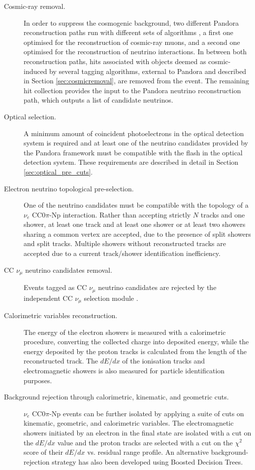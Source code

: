 \begin{description}
\item[Cosmic-ray removal.] In order to suppress the cosmogenic background, two different Pandora reconstruction paths run with different sets of algorithms \cite{Acciarri:2017hat}, a first one optimised for the reconstruction of cosmic-ray muons, and a second one optimised for the reconstruction of neutrino interactions. In between both reconstruction paths, hits associated with objects deemed as cosmic-induced by several tagging algorithms, external to Pandora and described in Section \ref{sec:cosmicremoval}, are removed from the event. The remaining hit collection provides the input to the Pandora neutrino reconstruction path, which outputs a list of candidate neutrinos.

\item[Optical selection.] A minimum amount of coincident photoelectrons in the optical detection system is required and at least one of the neutrino candidates provided by the Pandora framework must be compatible with the flash in the optical detection system. These requirements are described in detail in Section \ref{sec:optical_pre_cuts}.

\item[Electron neutrino topological pre-selection.] One of the neutrino candidates must be compatible with the topology of a $\nu_{e}$ CC0$\pi$-Np interaction. Rather than accepting strictly $N$ tracks and one shower, at least one track and at least one shower or at least two showers sharing a common vertex are accepted, due to the presence of split showers and split tracks. Multiple showers without reconstructed tracks are accepted due to a current track/shower identification inefficiency.

\item[CC $\nu_{\mu}$ neutrino candidates removal.] Events tagged as CC $\nu_{\mu}$ neutrino candidates are rejected by the independent CC $\nu_{\mu}$ selection module \cite{ubxsec}. 

\item[Calorimetric variables reconstruction.] The energy of the electron showers is measured with a calorimetric procedure, converting the collected charge into deposited energy, while the energy deposited by the proton tracks is calculated from the length of the reconstructed track. The $dE/dx$ of the ionisation tracks and electromagnetic showers is also measured for particle identification purposes.

\item[Background rejection through calorimetric, kinematic, and geometric cuts.] $\nu_{e}$ CC0$\pi$-Np events can be further isolated by applying a suite of cuts on kinematic, geometric, and calorimetric variables. The electromagnetic showers initiated by an electron in the final state are isolated with a cut on the $dE/dx$ value and the proton tracks are selected with a cut on the $\chi^{2}$ score of their $dE/dx$ vs. residual range profile. An alternative background-rejection strategy has also been developed using Boosted Decision Trees.
\end{description}


